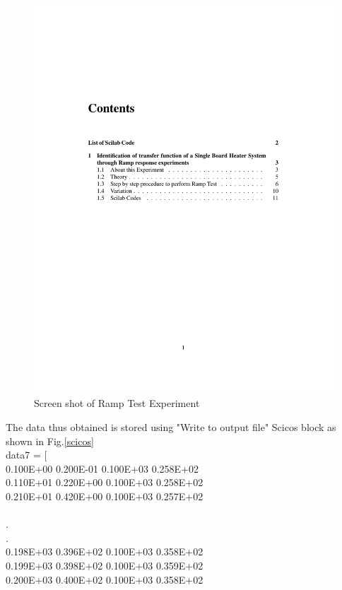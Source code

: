 \documentclass[12pt]{article}
\begin{document}
\begin{figure}[h]
\centering
\includegraphics[width=\linewidth]{ramptest}
\caption{Screen shot of Ramp Test Experiment}
\end{figure}
The data thus obtained is stored using "Write to output file" Scicos block as shown in Fig.\ref{scicos}\\
data7 = [\\
 0.100E+00  0.200E-01  0.100E+03  0.258E+02\\
 0.110E+01  0.220E+00  0.100E+03  0.258E+02\\
 0.210E+01  0.420E+00  0.100E+03  0.257E+02\\
\\
.\\
.\\
 0.198E+03  0.396E+02  0.100E+03  0.358E+02\\
 0.199E+03  0.398E+02  0.100E+03  0.359E+02\\
 0.200E+03  0.400E+02  0.100E+03  0.358E+02\\
\end{document}
